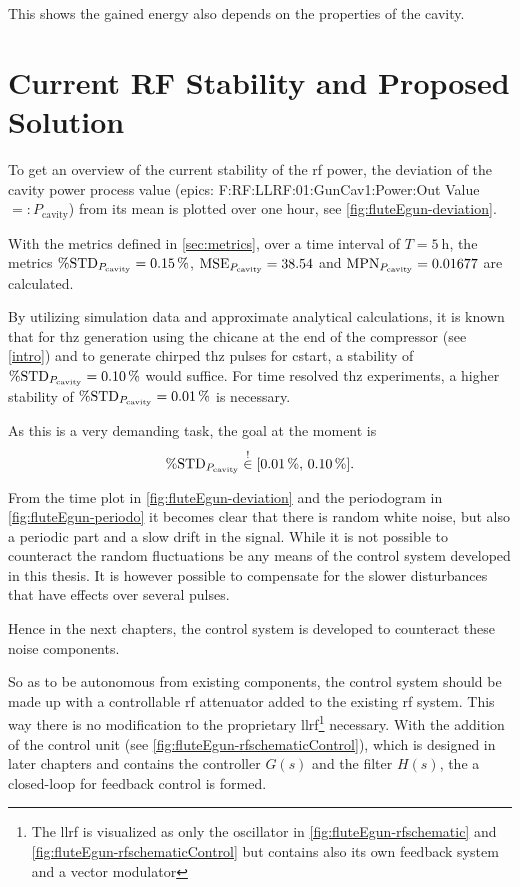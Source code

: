 This shows the gained energy also depends on the properties of the cavity.

\section{Current RF Stability and Proposed Solution}
To get an overview of the current stability of the \gls{rf} power, the deviation of the cavity power process value (\gls{epics}: F:RF:LLRF:01:GunCav1:Power:Out Value $=:P_\text{cavity}$) from its mean is plotted over one hour, see \autoref{fig:fluteEgun-deviation}.

With the metrics defined in \autoref{sec:metrics}, over a time interval of $T=\SI{5}{\hour}$, the metrics $\operatorname{\%STD}_{P_\text{cavity}}=\SI{0.15}{\percent}$, $\operatorname{MSE}_{P_\text{cavity}}=38.54$ and $\operatorname{MPN}_{P_\text{cavity}}=0.01677$ are calculated.

By utilizing simulation data and approximate analytical calculations, it is known that for \gls{thz} generation using the chicane at the end of the compressor (see \autoref{intro}) and to generate chirped \gls{thz} pulses for \gls{cstart}, a stability of $\operatorname{\%STD}_{P_\text{cavity}}=\SI{0.10}{\percent}$ would suffice. For time resolved \gls{thz} experiments, a higher stability of $\operatorname{\%STD}_{P_\text{cavity}}=\SI{0.01}{\percent}$ is necessary. \cite{Nigel2021}

As this is a very demanding task, the goal at the moment is 
\begin{equation}
\operatorname{\%STD}_{P_\text{cavity}} \overset{!}{\in} [\SI{0.01}{\percent},\,\SI{0.10}{\percent}].
\end{equation}


From the time plot in \autoref{fig:fluteEgun-deviation} and the periodogram in \autoref{fig:fluteEgun-periodo} it becomes clear that there is random white noise, but also a periodic part and a slow drift in the signal. While it is not possible to counteract the random fluctuations be any means of the control system developed in this thesis. It is however possible to compensate for the slower disturbances that have effects over several pulses.

Hence in the next chapters, the control system is developed to counteract these noise components. 

So as to be autonomous from existing components, the control system should be made up with a controllable \gls{rf} attenuator added to the existing \gls{rf} system. This way there is no modification to the proprietary \gls{llrf}\footnote{The \gls{llrf} is visualized as only the oscillator in \autoref{fig:fluteEgun-rfschematic} and \autoref{fig:fluteEgun-rfschematicControl} but contains also its own feedback system and a vector modulator} necessary. With the addition of the control unit (see \autoref{fig:fluteEgun-rfschematicControl}), which is designed in later chapters and contains the controller $G(s)$ and the filter $H(s)$, the a closed-loop for feedback control is formed.

